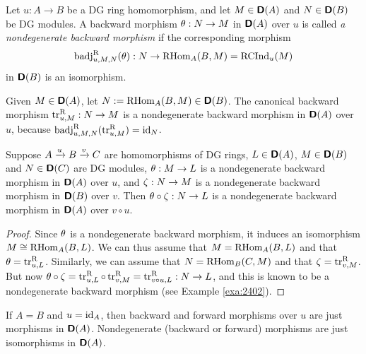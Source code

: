 \begin{dfn} \label{dfn:3190} 
Let $u : A \to B$ be a DG ring homomorphism, and let 
$M \in \boldsymbol{\mathsf{D}}(A)$ and $N \in \boldsymbol{\mathsf{D}}(B)$ be DG modules.
A backward morphism $\theta : N \to M$ in $\boldsymbol{\mathsf{D}}(A)$ over $u$ is called  
{\em a nondegenerate backward morphism}%
%
%
if the corresponding morphism
\[ \operatorname{badj}_{u, M, N}^{\mathrm{R}}(\theta) : N \to \operatorname{RHom}_A(B, M) 
= \operatorname{RCInd}_u(M) \]
in $\boldsymbol{\mathsf{D}}(B)$ is an isomorphism.
\end{dfn}

\begin{exa} \label{exa:2402}
Given $M \in \boldsymbol{\mathsf{D}}(A)$, let 
$N := \operatorname{RHom}_{A}(B, M) \in \boldsymbol{\mathsf{D}}(B)$. 
The canonical backward morphism 
$\operatorname{tr}_{u, M}^{\mathrm{R}} : N \to M$%
%
is a nondegenerate backward morphism
in $\boldsymbol{\mathsf{D}}(A)$ over $u$, because 
$\operatorname{badj}_{u, M, N}^{\mathrm{R}}(\operatorname{tr}_{u, M}^{\mathrm{R}}) = \operatorname{id}_N$.
\end{exa}

\begin{prop} \label{prop:3190}
Suppose $A \xrightarrow{u} B \xrightarrow{v} C$ are homomorphisms of DG rings,
$L \in \boldsymbol{\mathsf{D}}(A)$, $M \in \boldsymbol{\mathsf{D}}(B)$ and $N \in \boldsymbol{\mathsf{D}}(C)$ are DG 
modules, $\theta : M \to L$ is a nondegenerate backward morphism
in $\boldsymbol{\mathsf{D}}(A)$ over $u$, and $\zeta : N \to M$ is a nondegenerate backward 
morphism in $\boldsymbol{\mathsf{D}}(B)$ over $v$. Then 
$\theta \circ \zeta : N \to  L$
is a nondegenerate backward morphism in $\boldsymbol{\mathsf{D}}(A)$ over $v \circ u$.
\end{prop}

\begin{proof}
Since $\theta$ is a nondegenerate backward morphism, it induces an isomorphism 
$M \cong \operatorname{RHom}_{A}(B, L)$. We can thus assume that  
$M = \operatorname{RHom}_{A}(B, L)$ and that 
$\theta = \operatorname{tr}_{u, L}^{\mathrm{R}}$.
Similarly, we can assume that 
$N = \operatorname{RHom}_{B}(C, M)$ and that 
$\zeta = \operatorname{tr}_{v, M}^{\mathrm{R}}$.
But now 
$\theta \circ \zeta  =
\operatorname{tr}_{u, L}^{\mathrm{R}}  \circ \operatorname{tr}_{v, M}^{\mathrm{R}} = 
\operatorname{tr}_{v \circ u, L}^{\mathrm{R}} : N \to L$,
and this is known to be a nondegenerate backward morphism (see Example 
\ref{exa:2402}). 
\end{proof}

\begin{exa} \label{exa:2403}
If $A = B$ and $u = \operatorname{id}_A$, then 
backward and forward morphisms over $u$ are just morphisms in $\boldsymbol{\mathsf{D}}(A)$. 
Nondegenerate (backward or forward) morphisms are just isomorphisms in 
$\boldsymbol{\mathsf{D}}(A)$. 
\end{exa}



